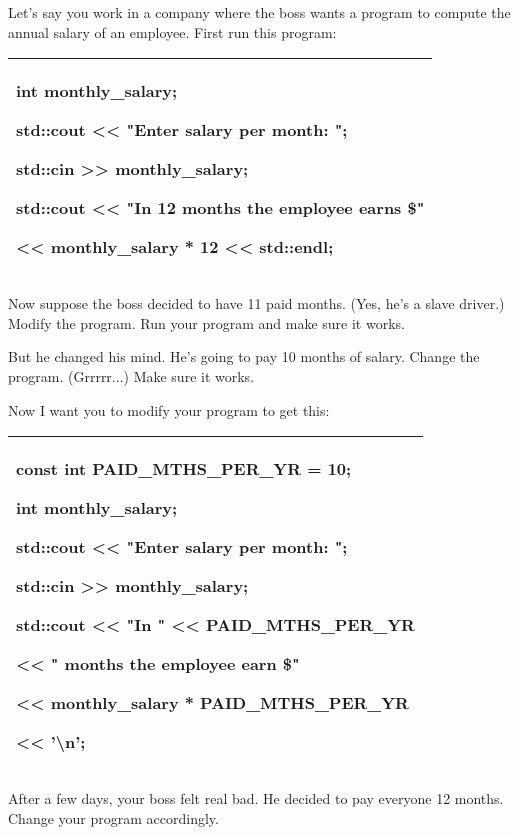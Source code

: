 \documentclass[
]{article}
\begin{document}
Let's say you work in a company where the boss wants a program to
compute the annual salary of an employee. First run this program:

\begin{longtable}[]{@{}l@{}}
\toprule
\endhead
\begin{minipage}[t]{0.97\columnwidth}\raggedright
int monthly\_salary;

std::cout \textless\textless{} "Enter salary per month: ";

std::cin \textgreater\textgreater{} monthly\_salary;

std::cout \textless\textless{} "In 12 months the employee earns \$"

\textless\textless{} monthly\_salary * 12 \textless\textless{}
std::endl;\strut
\end{minipage}\tabularnewline
\bottomrule
\end{longtable}

Now suppose the boss decided to have 11 paid months. (Yes, he's a slave
driver.) Modify the program. Run your program and make sure it works.

But he changed his mind. He's going to pay 10 months of salary. Change
the program. (Grrrrr...) Make sure it works.

Now I want you to modify your program to get this:

\begin{longtable}[]{@{}l@{}}
\toprule
\endhead
\begin{minipage}[t]{0.97\columnwidth}\raggedright
\textbf{const int PAID\_MTHS\_PER\_YR = 10};

int monthly\_salary;

std::cout \textless\textless{} "Enter salary per month: ";

std::cin \textgreater\textgreater{} monthly\_salary;

std::cout \textless\textless{} "In " \textless\textless{}
\textbf{PAID\_MTHS\_PER\_YR}

\textless\textless{} " months the employee earn \$"

\textless\textless{} monthly\_salary * \textbf{PAID\_MTHS\_PER\_YR }

\textbf{ \textless\textless{} }'\textbackslash n';\strut
\end{minipage}\tabularnewline
\bottomrule
\end{longtable}

After a few days, your boss felt real bad. He decided to pay everyone 12
months. Change your program accordingly.
\end{document}
